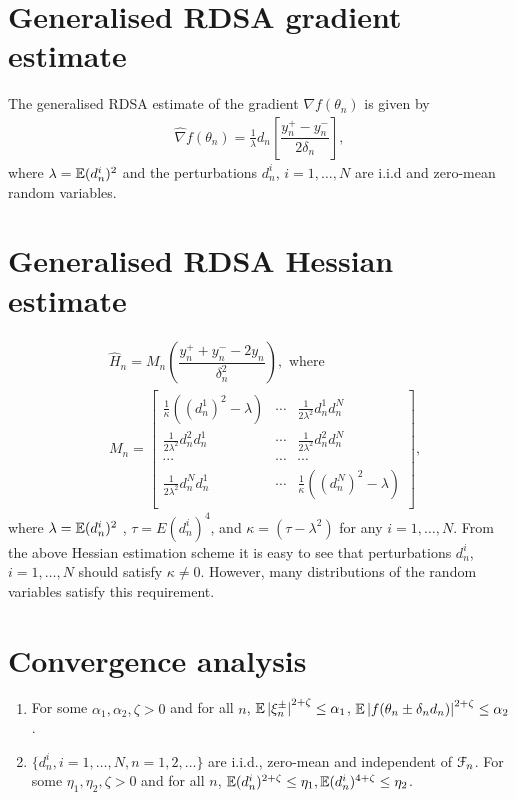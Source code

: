 \section{Generalised RDSA gradient estimate}
The generalised RDSA estimate of the gradient $\nabla f(\theta_n)$ is given by
\begin{align}
\label{eq:grad-gen}
\widehat\nabla f(\theta_n) = \frac1{\lambda} d_n \left[ \dfrac{y_n^+ - y_n^-}{2\delta_n}\right],
\end{align}
where $\lambda = \mathbb{E}(d_n^i)^2 $ and the perturbations $d_n^i$, $i=1,\ldots,N$ are i.i.d and zero-mean random variables. 

\section{Generalised RDSA Hessian estimate}
\begin{align}
\label{eq:2rdsa-estimate-gen}
&\widehat H_n = M_n \left(\dfrac{y_n^+ + y_n^- - 2 y_n}{\delta_n^2}\right), \text{ where }\\
& M_n =
\left[
\begin{array}{ccc}
\frac{1}{\kappa}\left((d_n^1)^2\!-\lambda\right) & \cdots & \frac{1}{2 \lambda^2}d_n^1 d_n^N\\
\frac{1}{2 \lambda^2}d_n^2 d_n^1  &  \cdots & \frac{1}{2 \lambda^2}d_n^2 d_n^N\\
\cdots&\cdots&\cdots\\
\frac{1}{2 \lambda^2}d_n^N d_n^1 & \cdots &  \frac{1}{\kappa}\left((d_n^N)^2-\lambda\right) \\
\end{array}
\right],\nonumber
\end{align}
where $\lambda = \mathbb{E}(d_n^i)^2 $ , $\tau = E (d_n^i)^4$, and $\kappa = \left(\tau - \lambda^2\right)$ for any $i=1,\ldots,N$.
From the above Hessian estimation scheme it is easy to see that perturbations $d_n^i$, $i=1,\ldots,N$ should satisfy  $\kappa \neq 0$. However, many distributions of the random variables satisfy this requirement. 

\section{Convergence analysis}
\label{sec:2rdsa-gen-results}
\begin{enumerate}[label=(\textbf{A\arabic*}),resume]
\item For some $\alpha_1, \alpha_2,\zeta >0$ and for all $n$, 
$\mathbb{E} \left|\xi_n^{\pm}\right|^{2+\zeta} \le \alpha_1$, $\mathbb{E} \left|f(\theta_n\pm \delta_n d_n)\right|^{2+\zeta} \le \alpha_2$. 
\item $\{d_n^i, i=1,\ldots,N, n=1,2,\ldots\}$ are i.i.d., zero-mean and independent of $\mathcal{F}_n$. For some $\eta_1,\eta_2,\zeta >0$ and for all $n$, $\mathbb{E}(d_n^i)^{2+\zeta} \le \eta_1,\mathbb{E}(d_n^i)^{4+\zeta} \le \eta_2$.
\end{enumerate}


